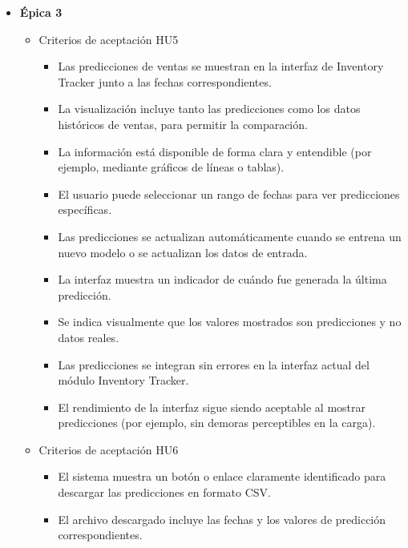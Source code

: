 \documentclass[
11pt, %
]{charter}
\begin{document}
\begin{itemize}
  \item \textbf{\'{E}pica 3}
    \begin{itemize}
    
      \item Criterios de aceptación HU5
      \begin{itemize}
      \item Las predicciones de ventas se muestran en la interfaz de Inventory Tracker junto a las fechas correspondientes.

      \item La visualización incluye tanto las predicciones como los datos históricos de ventas, para permitir la comparación.

      \item La información está disponible de forma clara y entendible (por ejemplo, mediante gráficos de líneas o tablas).

      \item El usuario puede seleccionar un rango de fechas para ver predicciones específicas.

      \item Las predicciones se actualizan automáticamente cuando se entrena un nuevo modelo o se actualizan los datos de entrada.

      \item La interfaz muestra un indicador de cuándo fue generada la última predicción.

      \item Se indica visualmente que los valores mostrados son predicciones y no datos reales.

      \item Las predicciones se integran sin errores en la interfaz actual del módulo Inventory Tracker.

      \item El rendimiento de la interfaz sigue siendo aceptable al mostrar predicciones (por ejemplo, sin demoras perceptibles en la carga).
	\end{itemize}
	
      \item Criterios de aceptación HU6
	\begin{itemize}
      \item El sistema muestra un botón o enlace claramente identificado para descargar las predicciones en formato CSV.

      \item El archivo descargado incluye las fechas y los valores de predicción correspondientes.


\end{itemize}
\end{itemize}
\end{itemize}
\end{document}
